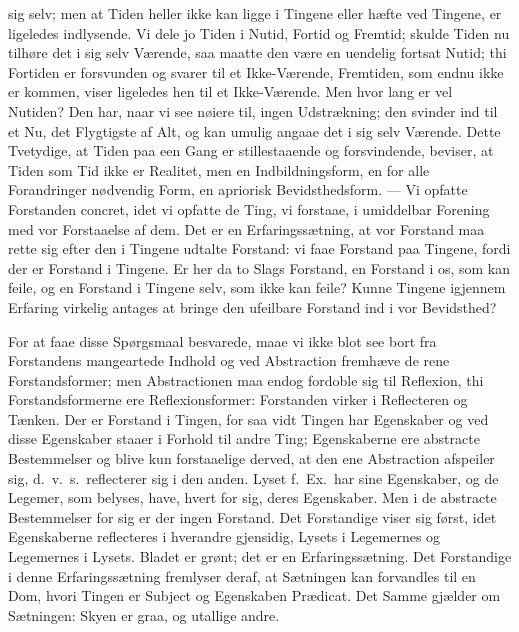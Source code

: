 \documentclass[12pt]{book}
\newcommand{\apage}[1]{\marginnote{\footnotesize\textit{[#1]}}}
\begin{document}
sig selv; men at Tiden heller ikke kan ligge i Tingene eller hæfte ved
Tingene, er ligeledes indlysende. Vi dele jo Tiden i Nutid, Fortid og
Fremtid; skulde Tiden nu tilhøre det i sig selv Værende, saa maatte den
være en uendelig \apage{35} fortsat Nutid; thi Fortiden er forsvunden og svarer til
et Ikke-Værende, Fremtiden, som endnu ikke er kommen, viser ligeledes hen
til et Ikke-Værende. Men hvor lang er vel Nutiden? Den har, naar vi see
nøiere til, ingen Udstrækning; den svinder ind til et Nu, det Flygtigste
af Alt, og kan umulig angaae det i sig selv Værende. Dette Tvetydige, at
Tiden paa een Gang er stillestaaende og forsvindende, beviser, at Tiden
som Tid ikke er Realitet, men en Indbildningsform, en for alle
Forandringer nødvendig Form, en apriorisk Bevidsthedsform. --- Vi opfatte
Forstanden concret, idet vi opfatte de Ting, vi forstaae, i umiddelbar
Forening med vor Forstaaelse af dem. Det er en Erfaringssætning, at vor
Forstand maa rette sig efter den i Tingene udtalte Forstand: vi faae
Forstand paa Tingene, fordi der er Forstand i Tingene. Er her da to Slags
Forstand, en Forstand i os, som kan feile, og en Forstand i Tingene selv,
som ikke kan feile? Kunne Tingene igjennem Erfaring virkelig antages at
bringe den ufeilbare Forstand ind i vor Bevidsthed?

For at faae disse Spørgsmaal besvarede, maae vi ikke blot see bort fra
Forstandens mangeartede Indhold og ved Abstraction fremhæve de rene
Forstandsformer; men Abstractionen maa endog fordoble sig til Reflexion,
thi Forstandsformerne ere Reflexionsformer: Forstanden virker i Reflecteren
og Tænken. Der er Forstand i Tingen, for saa vidt Tingen har Egenskaber og
ved disse Egenskaber staaer i Forhold til andre Ting; Egenskaberne ere
abstracte Bestemmelser og blive kun \apage{36} forstaaelige derved, at den ene
Abstraction afspeiler sig, d.\ v.\ s.\ reflecterer sig i den anden. Lyset f.\
Ex.\ har sine Egenskaber, og de Legemer, som belyses, have, hvert for sig,
deres Egenskaber. Men i de abstracte Bestemmelser for sig er der ingen
Forstand. Det Forstandige viser sig først, idet Egenskaberne reflecteres i
hverandre gjensidig, Lysets i Legemernes og Legemernes i Lysets. Bladet er
grønt; det er en Erfaringssætning. Det Forstandige i denne Erfaringssætning
fremlyser deraf, at Sætningen kan forvandles til en Dom, hvori Tingen er
Subject og Egenskaben Prædicat. Det Samme gjælder om Sætningen: Skyen er
graa, og utallige andre.
\end{document}

